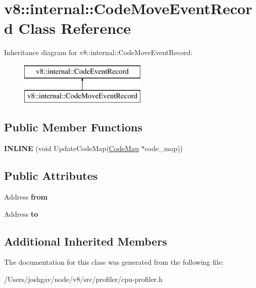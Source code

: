 \hypertarget{classv8_1_1internal_1_1_code_move_event_record}{}\section{v8\+:\+:internal\+:\+:Code\+Move\+Event\+Record Class Reference}
\label{classv8_1_1internal_1_1_code_move_event_record}
Inheritance diagram for v8\+:\+:internal\+:\+:Code\+Move\+Event\+Record\+:\begin{figure}[H]
\begin{center}
\leavevmode
\includegraphics[height=2.000000cm]{classv8_1_1internal_1_1_code_move_event_record}
\end{center}
\end{figure}
\subsection*{Public Member Functions}
\begin{DoxyCompactItemize}
\item 
{\bfseries I\+N\+L\+I\+NE} (void Update\+Code\+Map(\hyperlink{classv8_1_1internal_1_1_code_map}{Code\+Map} $\ast$code\+\_\+map))\hypertarget{classv8_1_1internal_1_1_code_move_event_record_a4f4e0621e8588af0558cba8221180164}{}\label{classv8_1_1internal_1_1_code_move_event_record_a4f4e0621e8588af0558cba8221180164}

\end{DoxyCompactItemize}
\subsection*{Public Attributes}
\begin{DoxyCompactItemize}
\item 
Address {\bfseries from}\hypertarget{classv8_1_1internal_1_1_code_move_event_record_a706eb1c919e9762fbce40b16422495cf}{}\label{classv8_1_1internal_1_1_code_move_event_record_a706eb1c919e9762fbce40b16422495cf}

\item 
Address {\bfseries to}\hypertarget{classv8_1_1internal_1_1_code_move_event_record_a09d5ae47ce69f2db80de5384e54521c4}{}\label{classv8_1_1internal_1_1_code_move_event_record_a09d5ae47ce69f2db80de5384e54521c4}

\end{DoxyCompactItemize}
\subsection*{Additional Inherited Members}


The documentation for this class was generated from the following file\+:\begin{DoxyCompactItemize}
\item 
/\+Users/joshgav/node/v8/src/profiler/cpu-\/profiler.\+h\end{DoxyCompactItemize}
